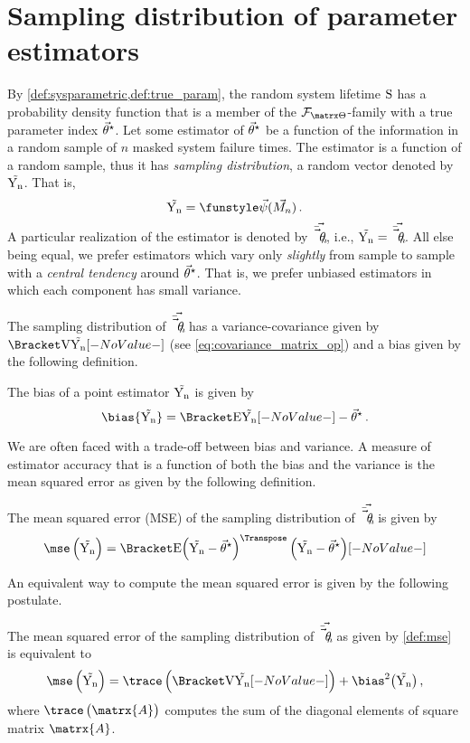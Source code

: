 \documentclass[ ../main.tex]{subfiles}
\begin{document}
\chapter{Sampling distribution of parameter estimators}
\label{sec:general_estimating_parameters:mle}
By \cref{def:sysparametric,def:true_param}, the random system lifetime $\mathrm{S}$ has a probability density function that is a member of the $\pfam$-family with a true parameter index ${\vec{\theta}}^{\star}$. Let some estimator of ${\vec{\theta}}^{\star}$ be a function of the information in a random sample of $n$ masked system failure times. The estimator is a function of a random sample, thus it has \emph{sampling distribution}, a random vector denoted by $\mathrm{\vec{Y_n}}$. That is,
\begin{equation}
\sampdpt = \Fun{\vec{\psi}}(\mfs)\,.
\end{equation}
A particular realization of the estimator is denoted by $\vec{\bar{\vec{\theta}}_{n}}$, i.e., $\mathrm{\vec{Y_n}} = \vec{\bar{\vec{\theta}}_{n}}$. All else being equal, we prefer estimators which vary only \emph{slightly} from sample to sample with a \emph{central tendency} around ${\vec{\theta}}^{\star}$. That is, we prefer unbiased estimators in which each component has small variance.

The sampling distribution of $\vec{\bar{\vec{\theta}}_{n}}$ has a variance-covariance given by $\Var{\sampdpt}$ (see \cref{eq:covariance_matrix_op}) and a bias given by the following definition.
\begin{definition}
The bias of a point estimator $\mathrm{\vec{Y_n}}$ is given by
\begin{equation}
    \bias{\sampdpt} = \Expect{\sampdpt} - \tparam\sysparamvec\,.
\end{equation}
\end{definition}
We are often faced with a trade-off between bias and variance. A measure of estimator accuracy that is a function of both the bias and the variance is the mean squared error as given by the following definition.
\begin{definition}
\label{def:mse}
The mean squared error (MSE) of the sampling distribution of $\vec{\bar{\vec{\theta}}_{n}}$ is given by
\begin{equation}
\label{eq:mse}
\mse \left( \sampdpt \right) = \Expect{
        \left (
            \sampdpt - \tparam\sysparamvec
        \right )^{\Transpose}
        \left (
            \sampdpt - \tparam\sysparamvec
        \right )}
\end{equation}
\end{definition}
An equivalent way to compute the mean squared error is given by the following postulate.
\begin{postulate}
The mean squared error of the sampling distribution of $\vec{\bar{\vec{\theta}}_{n}}$ as given by \cref{def:mse} is equivalent to
\begin{equation}
\label{eq:mse_bias_var}
\mse \left( \sampdpt \right) = \trace\left(\Var{\sampdpt}\right) +
    \bias^2 \bigl(\sampdpt \bigr)\,,
\end{equation}
where $\trace\left(\matrx{A}\right)$ computes the sum of the diagonal elements of square matrix $\matrx{A}$.
\end{postulate}
\end{document}
